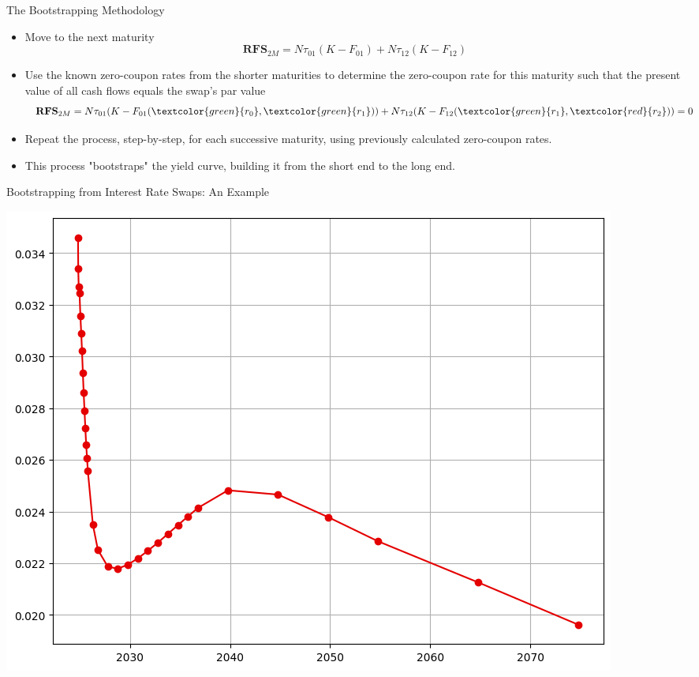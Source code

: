 \documentclass{beamer}
\begin{document}
\begin{frame}{The Bootstrapping Methodology}
\begin{itemize}
\item Move to the next maturity
\begin{equation*}
\textbf{RFS}_{2M} = N\tau_{01} (K-F_{01}) + N\tau_{12} (K-F_{12})
\end{equation*}
\item Use the known zero-coupon rates from the shorter maturities to determine the zero-coupon rate for this maturity such that the present value of all cash flows equals the swap's par value
\begin{equation*}
\textbf{RFS}_{2M} = N\tau_{01} (K-F_{01}(\textcolor{green}{r_0}, \textcolor{green}{r_1})) + N\tau_{12} (K-F_{12}(\textcolor{green}{r_1}, \textcolor{red}{r_2})) = 0
\end{equation*}
\item Repeat the process, step-by-step, for each successive maturity, using previously calculated zero-coupon rates.
\item This process "bootstraps" the yield curve, building it from the short end to the long end.
\end{itemize}
\end{frame}

\begin{frame}{Bootstrapping from Interest Rate Swaps: An Example}
\begin{center}
    \includegraphics[width=0.6\linewidth]{images/forward_rate_curve}
\end{center}
\end{frame}
\end{document}
